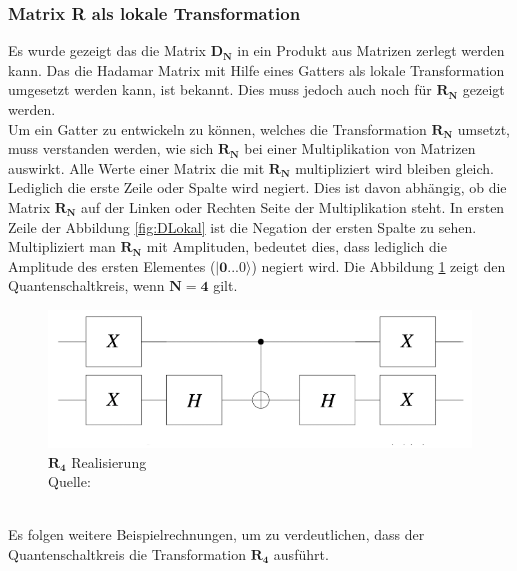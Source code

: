 \subsubsection{Matrix R als lokale Transformation}
Es wurde gezeigt das die Matrix $\mathbf{D_N}$ in ein Produkt aus Matrizen zerlegt werden kann. Das die Hadamar Matrix mit Hilfe eines Gatters als lokale Transformation umgesetzt werden kann, ist bekannt. Dies muss jedoch auch noch für $\mathbf{R_N}$ gezeigt werden. 
\\
Um ein Gatter zu entwickeln zu können, welches die Transformation $\mathbf{R_N}$ umsetzt, muss verstanden werden, wie sich $\mathbf{R_N}$ bei einer Multiplikation von Matrizen auswirkt. Alle Werte einer Matrix die mit $\mathbf{R_N}$ multipliziert wird bleiben gleich. Lediglich die erste Zeile oder Spalte wird negiert. Dies ist davon abhängig, ob die Matrix $\mathbf{R_N}$ auf der Linken oder Rechten Seite der Multiplikation steht. In ersten Zeile der Abbildung \ref{fig:DLokal} ist die Negation der ersten Spalte zu sehen.
\\
Multipliziert man $\mathbf{R_N}$ mit Amplituden, bedeutet dies, dass lediglich die Amplitude des ersten Elementes ($\mathbf{|0...0\rangle}$) negiert wird.
Die Abbildung \ref{fig:Rgatter} zeigt den Quantenschaltkreis, wenn $\mathbf{N = 4}$ gilt.
 \begin{figure}[hbtp]
 	\centering
 	\includegraphics[width=.8\textwidth]{figures/rgatter.png}
 	\caption{$\mathbf{R_4}$ Realisierung \\ Quelle: \cite[S. 145]{Ho17}}
 	\label{fig:Rgatter}
 \end{figure}
\\
Es folgen weitere Beispielrechnungen, um zu verdeutlichen, dass der Quantenschaltkreis die Transformation $\mathbf{R_4}$ ausführt.

